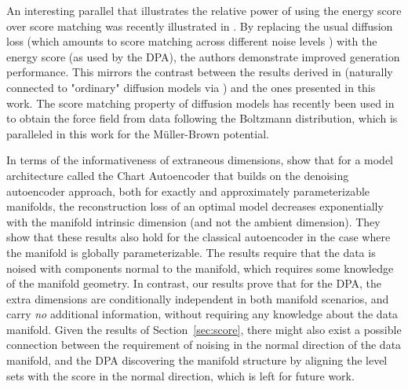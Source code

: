 
An interesting parallel that illustrates the relative power of using the energy score over score matching was recently illustrated in \citet{bortoli_distributional_2025}. By replacing the usual diffusion loss (which amounts to score matching across different noise levels \citep{song_score-based_2021}) with the energy score (as used by the DPA), the authors demonstrate improved generation performance. This mirrors the contrast between the results derived in \citep{alain_what_2014} (naturally connected to "ordinary" diffusion models via \citep{vincent_connection_2011}) and the ones presented in this work.
The score matching property of diffusion models has recently been used in \citep{arts_two_2023} to obtain the force field from data following the Boltzmann distribution, which is paralleled in this work for the Müller-Brown potential.





In terms of the informativeness of extraneous dimensions, \citet{liu_deep_2023} show that for a model architecture called the Chart Autoencoder \citep{schonsheck_chart_2020} that builds on the denoising autoencoder approach, both for exactly and approximately parameterizable manifolds, the reconstruction loss of an optimal model decreases exponentially with the manifold intrinsic dimension (and not the ambient dimension). They show that these results also hold for the classical autoencoder in the case where the manifold is globally parameterizable. The results require that the data is noised with components normal to the manifold, which requires some knowledge of the manifold geometry. In contrast, our results prove that for the DPA, the extra dimensions are conditionally independent in both manifold scenarios, and carry \textit{no} additional information, without requiring any knowledge about the data manifold. Given the results of Section~\ref{sec:score}, there might also exist a possible connection between the requirement of noising in the normal direction of the data manifold, and the DPA discovering the manifold structure by aligning the level sets with the score in the normal direction, which is left for future work.

